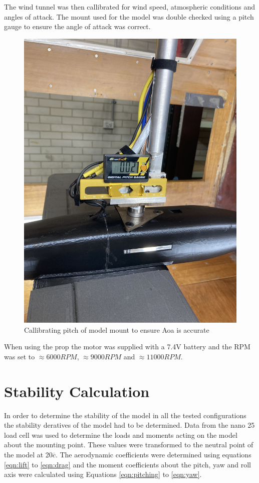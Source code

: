 The wind tunnel was then callibrated for wind speed, atmospheric conditions and angles of attack. The mount used for the model was double checked using a pitch gauge to ensure the angle of attack was correct. 
\begin{figure}
    \centering
    \includegraphics[scale=0.1]{04_Methodology/Figs/pitchGauge.jpg}
    \caption{Callibrating pitch of model mount to ensure Aoa is accurate}
    \label{fig:pitchGauge}
\end{figure}

When using the prop the motor was supplied with a 7.4V battery and the RPM was set to $\approx 6000 RPM$, $\approx 9000RPM$ and $\approx 11000 RPM$. 






\section{Stability Calculation}
In order to determine the stability of the model in all the tested configurations the stability deratives of the model had to be determined. Data from the nano 25 load cell was used to determine the loads and moments acting on the model about the mounting point. These values were transformed  to the neutral point of the model at 20$\overline{c}$. The aerodynamic coefficients were determined using equations \ref{eqn:lift} to \ref{eqn:drag} and the moment coefficients about the pitch, yaw and roll axis were calculated using Equations \ref{eqn:pitching} to \ref{eqn:yaw}. 





